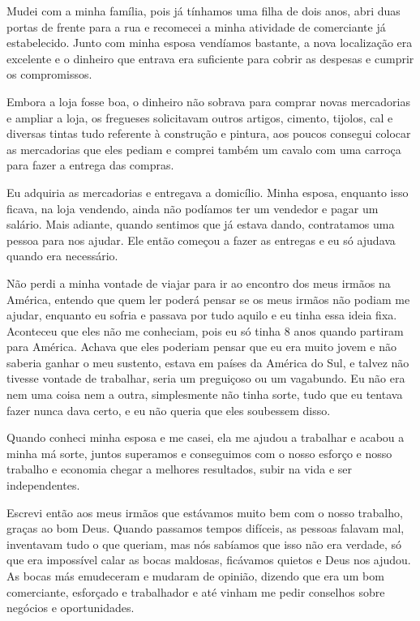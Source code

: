Mudei com a minha família, pois já tínhamos uma filha de dois anos, abri
duas portas de frente para a rua e recomecei a minha atividade de
comerciante já estabelecido. Junto com minha esposa vendíamos bastante,
a nova localização era excelente e o dinheiro que entrava era suficiente
para cobrir as despesas e cumprir os compromissos.

Embora a loja fosse boa, o dinheiro não sobrava para comprar novas
mercadorias e ampliar a loja, os fregueses solicitavam outros artigos,
cimento, tijolos, cal e diversas tintas tudo referente à construção e
pintura, aos poucos consegui colocar as mercadorias que eles pediam e
comprei também um cavalo com uma carroça para fazer a entrega das
compras.

Eu adquiria as mercadorias e entregava a domicílio. Minha esposa,
enquanto isso ficava, na loja vendendo, ainda não podíamos ter um
vendedor e pagar um salário. Mais adiante, quando sentimos que já estava
dando, contratamos uma pessoa para nos ajudar. Ele então começou a fazer
as entregas e eu só ajudava quando era necessário.

Não perdi a minha vontade de viajar para ir ao encontro dos meus irmãos
na América, entendo que quem ler poderá pensar se os meus irmãos não
podiam me ajudar, enquanto eu sofria e passava por tudo aquilo e eu
tinha essa ideia fixa. Aconteceu que eles não me conheciam, pois eu só
tinha 8 anos quando partiram para América. Achava que eles poderiam
pensar que eu era muito jovem e não saberia ganhar o meu sustento,
estava em países da América do Sul, e talvez não tivesse vontade de
trabalhar, seria um preguiçoso ou um vagabundo. Eu não era nem uma coisa
nem a outra, simplesmente não tinha sorte, tudo que eu tentava fazer
nunca dava certo, e eu não queria que eles soubessem disso.

Quando conheci minha esposa e me casei, ela me ajudou a trabalhar e
acabou a minha má sorte, juntos superamos e conseguimos com o nosso
esforço e nosso trabalho e economia chegar a melhores resultados, subir
na vida e ser independentes.

Escrevi então aos meus irmãos que estávamos muito bem com o nosso
trabalho, graças ao bom Deus. Quando passamos tempos difíceis, as
pessoas falavam mal, inventavam tudo o que queriam, mas nós sabíamos que
isso não era verdade, só que era impossível calar as bocas maldosas,
ficávamos quietos e Deus nos ajudou. As bocas más emudeceram e mudaram
de opinião, dizendo que era um bom comerciante, esforçado e trabalhador
e até vinham me pedir conselhos sobre negócios e oportunidades.

